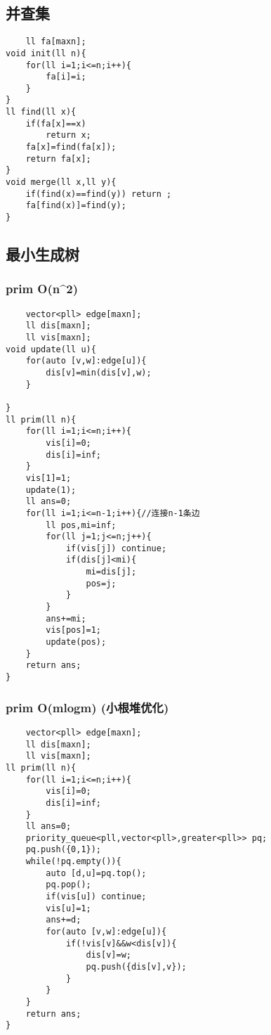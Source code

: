 \documentclass[]{article}
\begin{document}
\hypertarget{ux5e76ux67e5ux96c6-1}{%
\subsection{并查集}\label{ux5e76ux67e5ux96c6-1}}

\begin{verbatim}
    ll fa[maxn];
void init(ll n){
    for(ll i=1;i<=n;i++){
        fa[i]=i;
    }
}
ll find(ll x){
    if(fa[x]==x)
        return x;
    fa[x]=find(fa[x]);
    return fa[x];
}
void merge(ll x,ll y){
    if(find(x)==find(y)) return ;
    fa[find(x)]=find(y);
}
\end{verbatim}

\hypertarget{ux6700ux5c0fux751fux6210ux6811}{%
\subsection{最小生成树}\label{ux6700ux5c0fux751fux6210ux6811}}

\hypertarget{prim-on2}{%
\subsubsection{prim O(n\^{}2)}\label{prim-on2}}

\begin{verbatim}
    vector<pll> edge[maxn];
    ll dis[maxn];
    ll vis[maxn];
void update(ll u){
    for(auto [v,w]:edge[u]){
        dis[v]=min(dis[v],w);
    }

}
ll prim(ll n){
    for(ll i=1;i<=n;i++){
        vis[i]=0;
        dis[i]=inf;
    }
    vis[1]=1;
    update(1);
    ll ans=0;
    for(ll i=1;i<=n-1;i++){//连接n-1条边
        ll pos,mi=inf;
        for(ll j=1;j<=n;j++){
            if(vis[j]) continue;
            if(dis[j]<mi){
                mi=dis[j];
                pos=j;
            }
        }
        ans+=mi;
        vis[pos]=1;
        update(pos);    
    }
    return ans;
}
\end{verbatim}

\hypertarget{prim-omlogm-ux5c0fux6839ux5806ux4f18ux5316}{%
\subsubsection{prim O(mlogm)
(小根堆优化)}\label{prim-omlogm-ux5c0fux6839ux5806ux4f18ux5316}}

\begin{verbatim}
    vector<pll> edge[maxn];
    ll dis[maxn];
    ll vis[maxn];
ll prim(ll n){
    for(ll i=1;i<=n;i++){
        vis[i]=0;
        dis[i]=inf;
    }
    ll ans=0;
    priority_queue<pll,vector<pll>,greater<pll>> pq;
    pq.push({0,1});
    while(!pq.empty()){
        auto [d,u]=pq.top();
        pq.pop();
        if(vis[u]) continue;
        vis[u]=1;
        ans+=d;
        for(auto [v,w]:edge[u]){
            if(!vis[v]&&w<dis[v]){
                dis[v]=w;
                pq.push({dis[v],v});
            }
        }
    }
    return ans;
}
\end{verbatim}
\end{document}
